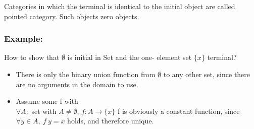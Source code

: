         Categories in which the terminal is identical to the initial object are called pointed category. Such objects zero objects.

    \subsubsection {Example:}
    How to show that $\emptyset$ is initial in Set and the one- element set $\{x\}$ terminal?

    \begin {itemize}
    \item There is only the binary union function from $\emptyset$ to any other set, since there are no arguments in the domain to use.
    \item Assume some f with
      \\ $\forall A:$ set with $A \neq \emptyset$, $ f: A \to \{x\}$
      f is obviously a constant function, since $\forall y \in A,\ f \ y = x$ holds, and therefore unique.
		\end{itemize}


